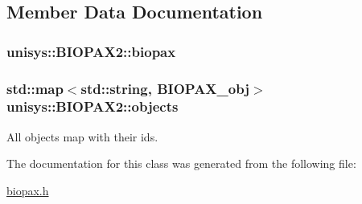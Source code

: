 \subsection{Member Data Documentation}
\hypertarget{classunisys_1_1BIOPAX2_adbffce99fec989b7e1318bffdb88697a}{
\subsubsection[{biopax}]{ unisys\-::\-B\-I\-O\-P\-A\-X2\-::biopax\hspace{0.3cm}{\ttfamily [private]}}}\label{classunisys_1_1BIOPAX2_adbffce99fec989b7e1318bffdb88697a}
\hypertarget{classunisys_1_1BIOPAX2_aaa492741eb15232183400166a123f94d}{
\subsubsection[{objects}]{\setlength{\rightskip}{0pt plus 5cm}std\-::map$<$std\-::string, {\bf B\-I\-O\-P\-A\-X\-\_\-obj}$>$ unisys\-::\-B\-I\-O\-P\-A\-X2\-::objects\hspace{0.3cm}{\ttfamily [private]}}}\label{classunisys_1_1BIOPAX2_aaa492741eb15232183400166a123f94d}


All objects map with their ids. 



The documentation for this class was generated from the following file\-:\begin{DoxyCompactItemize}
\item 
\hyperlink{biopax_8h}{biopax.\-h}\end{DoxyCompactItemize}
